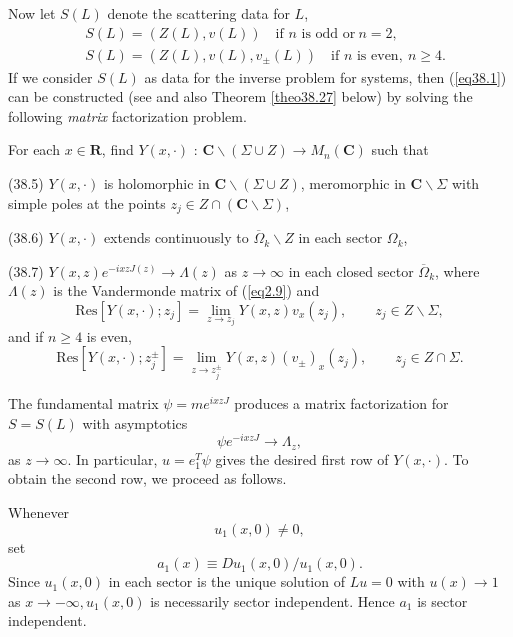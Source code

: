 \documentclass{surv-l}
\theoremstyle{plain}
\theoremstyle{definition}
\numberwithin{equation}{chapter}
\begin{document}
Now let $S(L)$ denote the scattering data for $L$,
\begin{align*}
&S(L)=(Z(L),v(L))\quad \text{if $n$ is odd or}\ n =2, \\
&S(L)=(Z(L),v(L),v_{\pm}(L))\quad \text{if $n$ is even},\ n\geq 4.
\end{align*}
If we consider $S(L)$ as data for the inverse problem for systems, then (\ref{eq38.1}) can be constructed (see \cite{BC1} and also Theorem \ref{theo38.27} below) by solving the following \emph{matrix} factorization problem.

For each $x\in \textbf{R}$, find $Y(x,\cdot)$ : $\textbf{C}\backslash (\Sigma\cup Z)\rightarrow M_{n}(\textbf{C})$ such that

(38.5) $Y(x,\cdot)$ is holomorphic in $\textbf{C}\backslash(\Sigma\cup Z)$, meromorphic in $ \textbf{C}\backslash \Sigma$ with simple poles at the points $z_{j}\in Z\cap(\textbf{C}\backslash \Sigma)$,

(38.6) $Y(x,\cdot)$ extends continuously to $\overline{\Omega}_{k}\backslash Z$ in each sector $\Omega_{k}$,

(38.7) $Y(x, z)e^{-ixzJ(z)}\rightarrow\Lambda(z)$ as $ z\rightarrow\infty$ in each closed sector $\overline{\Omega}_{k}$, where $\Lambda(z)$ is the Vandermonde matrix of (\ref{eq2.9}) and
\setcounter{equation}{7}
\begin{equation}\label{eq38.8}
\mathrm{Res}[Y(x,\cdot);z_{j}]=\lim_{z\rightarrow z_{j}}Y(x, z)v_{x}(z_{j}), \qquad z_{j}\in Z\backslash \Sigma,
\end{equation}
and if $n\geq 4$ is even,
\begin{equation}\label{eq38.9}
\mathrm{Res}[Y(x,\cdot);z_{j}^{\pm}]=\lim_{z\rightarrow z_{j}^{\pm}}Y(x, z)(v_{\pm})_{x}(z_{j}), \qquad  z_{j}\in Z\cap\Sigma.
\end{equation}

The fundamental matrix $\psi=me^{ixzJ}$ produces a matrix factorization for $S=S(L)$ with asymptotics
\begin{equation*}
\psi e^{-ixzJ}\rightarrow\Lambda_{z},
\end{equation*}
as $ z\rightarrow\infty$. In particular, $ u=e_{1}^{T}\psi$ gives the desired first row of $Y(x,\cdot)$. To obtain the second row, we proceed as follows.

Whenever
\begin{equation}\label{eq38.10}
u_{1}(x, 0)\neq 0,
\end{equation}
set
\begin{equation}\label{eq38.11}
a_{1}(x)\equiv Du_{1}(x,0)/u_{1}(x, 0).
\end{equation}
Since $u_{1}(x, 0)$ in each sector is the unique solution of $Lu=0$ with $u(x)\rightarrow 1$ as $ x\rightarrow-\infty, u_{1}(x, 0)$ is necessarily sector independent. Hence $a_{1}$ is sector independent.
\end{document}
